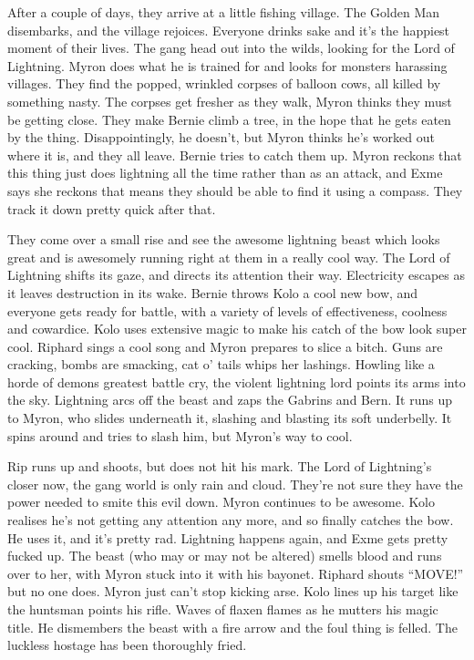 \begin{multicols}{2}
After a couple of days, they arrive at a little fishing village. The Golden Man disembarks, and the village rejoices. Everyone drinks sake and it’s the happiest moment of their lives. The gang head out into the wilds, looking for the Lord of Lightning. Myron does what he is trained for and looks for monsters harassing villages. They find the popped, wrinkled corpses of balloon cows, all killed by something nasty. The corpses get fresher as they walk, Myron thinks they must be getting close. They make Bernie climb a tree, in the hope that he gets eaten by the thing. Disappointingly, he doesn’t, but Myron thinks he’s worked out where it is, and they all leave. Bernie tries to catch them up. Myron reckons that this thing just does lightning all the time rather than as an attack, and Exme says she reckons that means they should be able to find it using a compass. They track it down pretty quick after that.\medskip

They come over a small rise and see the awesome lightning beast which looks great and is awesomely running right at them in a really cool way. The Lord of Lightning shifts its gaze, and directs its attention their way. Electricity escapes as it leaves destruction in its wake. Bernie throws Kolo a cool new bow, and everyone gets ready for battle, with a variety of levels of effectiveness, coolness and cowardice. Kolo uses extensive magic to make his catch of the bow look super cool. Riphard sings a cool song and Myron prepares to slice a bitch. Guns are cracking, bombs are smacking, cat o' tails whips her lashings. Howling like a horde of demons greatest battle cry, the violent lightning lord points its arms into the sky. Lightning arcs off the beast and zaps the Gabrins and Bern. It runs up to Myron, who slides underneath it, slashing and blasting its soft underbelly. It spins around and tries to slash him, but Myron’s way to cool.\medskip

Rip runs up and shoots, but does not hit his mark. The Lord of Lightning's closer now, the gang world is only rain and cloud. They’re not sure they have the power needed to smite this evil down. Myron continues to be awesome. Kolo realises he’s not getting any attention any more, and so finally catches the bow. He uses it, and it’s pretty rad. Lightning happens again, and Exme gets pretty fucked up. The beast (who may or may not be altered) smells blood and runs over to her, with Myron stuck into it with his bayonet. Riphard shouts “MOVE!” but no one does. Myron just can’t stop kicking arse. Kolo lines up his target like the huntsman points his rifle. Waves of flaxen flames as he mutters his magic title. He dismembers the beast with a fire arrow and the foul thing is felled. The luckless hostage has been thoroughly fried.\medskip


\end{multicols}
